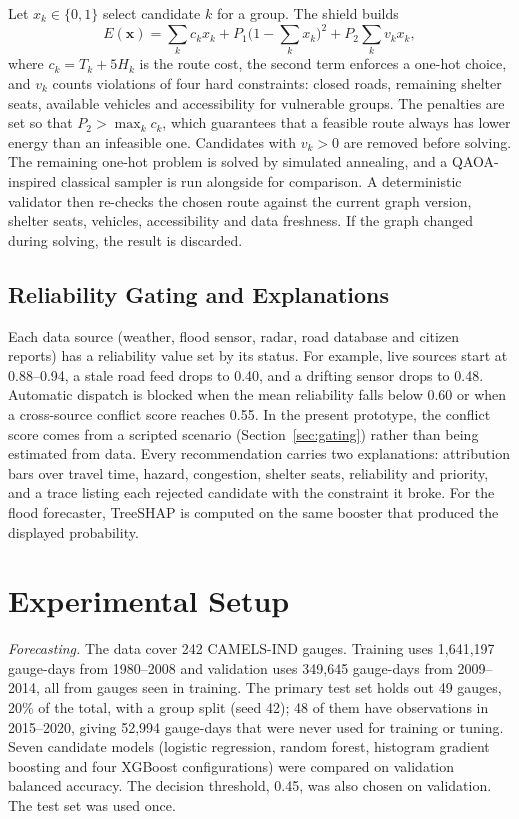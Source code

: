 \documentclass[conference]{IEEEtran}
\begin{document}
Let $x_k\in\{0,1\}$ select candidate $k$ for a group. The shield builds
\begin{equation}
E(\mathbf{x})=\sum_k c_k x_k + P_1\Big(1-\sum_k x_k\Big)^2 + P_2\sum_k v_k x_k ,
\label{eq:qubo}
\end{equation}
where $c_k=T_k+5H_k$ is the route cost, the second term enforces a one-hot choice, and $v_k$ counts violations of four hard constraints: closed roads, remaining shelter seats, available vehicles and accessibility for vulnerable groups. The penalties are set so that $P_2>\max_k c_k$, which guarantees that a feasible route always has lower energy than an infeasible one. Candidates with $v_k>0$ are removed before solving. The remaining one-hot problem is solved by simulated annealing, and a QAOA-inspired classical sampler is run alongside for comparison. A deterministic validator then re-checks the chosen route against the current graph version, shelter seats, vehicles, accessibility and data freshness. If the graph changed during solving, the result is discarded.

\subsection{Reliability Gating and Explanations}
Each data source (weather, flood sensor, radar, road database and citizen reports) has a reliability value set by its status. For example, live sources start at 0.88--0.94, a stale road feed drops to 0.40, and a drifting sensor drops to 0.48. Automatic dispatch is blocked when the mean reliability falls below 0.60 or when a cross-source conflict score reaches 0.55. In the present prototype, the conflict score comes from a scripted scenario (Section~\ref{sec:gating}) rather than being estimated from data. Every recommendation carries two explanations: attribution bars over travel time, hazard, congestion, shelter seats, reliability and priority, and a trace listing each rejected candidate with the constraint it broke. For the flood forecaster, TreeSHAP is computed on the same booster that produced the displayed probability.

\section{Experimental Setup}
\textit{Forecasting.} The data cover 242 CAMELS-IND gauges. Training uses 1,641,197 gauge-days from 1980--2008 and validation uses 349,645 gauge-days from 2009--2014, all from gauges seen in training. The primary test set holds out 49 gauges, 20\% of the total, with a group split (seed 42); 48 of them have observations in 2015--2020, giving 52,994 gauge-days that were never used for training or tuning. Seven candidate models (logistic regression, random forest, histogram gradient boosting and four XGBoost \cite{Chen2016} configurations) were compared on validation balanced accuracy. The decision threshold, 0.45, was also chosen on validation. The test set was used once.
\end{document}
